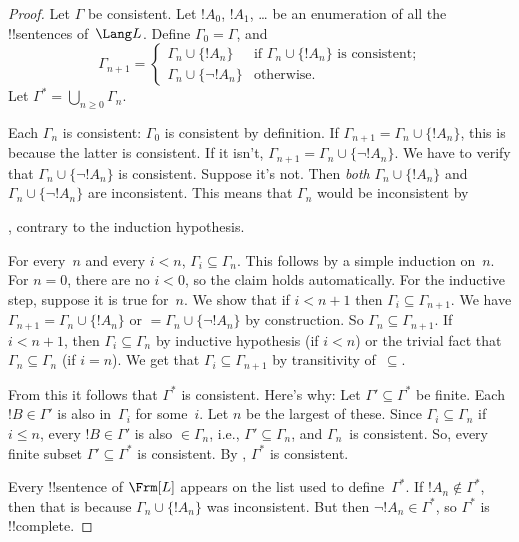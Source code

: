 \begin{proof}
Let $\Gamma$ be consistent.  Let $!A_0$, $!A_1$,
\dots{} be an enumeration of all the !!{sentence}s of~$\Lang L$.
Define $\Gamma_0 = \Gamma$, and
\[
\Gamma_{n+1} =
\begin{cases}
\Gamma_n \cup \{ !A_n \} & \textrm{if $\Gamma_n \cup \{!A_n\}$ is
  consistent;} \\
\Gamma_n \cup \{ \lnot !A_n \} & \textrm{otherwise.}
\end{cases}
\]
Let $\Gamma^* = \bigcup_{n \geq 0} \Gamma_n$.

Each $\Gamma_n$ is consistent: $\Gamma_0$ is consistent by definition.
If $\Gamma_{n+1} = \Gamma_n \cup \{!A_n\}$, this is because the latter
is consistent.  If it isn't, $\Gamma_{n+1} = \Gamma_n \cup \{\lnot
!A_n\}$. We have to verify that $\Gamma_n \cup \{\lnot !A_n\}$ is
consistent. Suppose it's not. Then \emph{both} $\Gamma_n \cup
\{!A_n\}$ and $\Gamma_n \cup \{\lnot !A_n\}$ are inconsistent.  This
means that $\Gamma_n$ would be inconsistent by

  ,
contrary to the induction hypothesis.

For every~$n$ and every $i < n$, $\Gamma_i \subseteq \Gamma_n$. This
follows by a simple induction on~$n$. For $n=0$, there are no $i < 0$,
so the claim holds automatically.  For the inductive step, suppose it
is true for~$n$. We show that if $i < n+1$ then $\Gamma_i \subseteq
\Gamma_{n+1}$. We have $\Gamma_{n+1} = \Gamma_n \cup \{!A_n\}$ or $=
\Gamma_n \cup \{\lnot !A_n\}$ by construction. So $\Gamma_n \subseteq
\Gamma_{n+1}$. If $i < n+1$, then $\Gamma_i \subseteq \Gamma_n$ by
inductive hypothesis (if $i < n$) or the trivial fact that $\Gamma_n
\subseteq \Gamma_n$ (if $i = n$). We get that $\Gamma_i \subseteq
\Gamma_{n+1}$ by transitivity of~$\subseteq$.

From this it follows that $\Gamma^*$ is consistent. Here's why: Let
$\Gamma' \subseteq \Gamma^*$ be finite. Each $!B \in \Gamma'$ is also
in~$\Gamma_i$ for some~$i$. Let $n$ be the largest of these. Since
$\Gamma_i \subseteq \Gamma_n$ if $i \le n$, every $!B \in \Gamma'$ is
also $\in \Gamma_n$, i.e., $\Gamma' \subseteq \Gamma_n$, and
$\Gamma_n$~is consistent. So, every finite subset $\Gamma' \subseteq
\Gamma^*$ is consistent. By 
  , $\Gamma^*$ is
  consistent.

Every !!{sentence} of $\Frm[L]$ appears on the list used to
define~$\Gamma^*$. If $!A_n \notin \Gamma^*$, then that is because
$\Gamma_n \cup \{!A_n\}$ was inconsistent.  But then $\lnot !A_n
\in \Gamma^*$, so $\Gamma^*$ is !!{complete}.
\end{proof}





